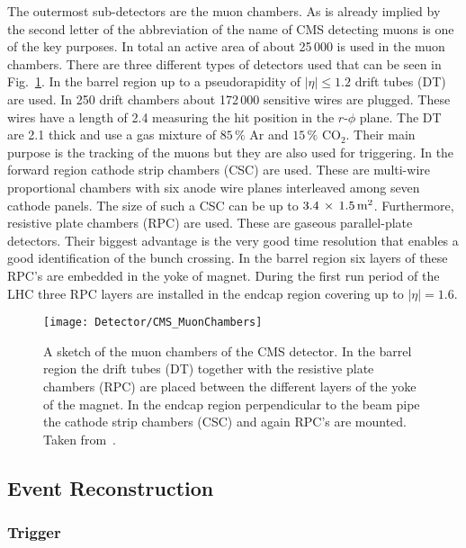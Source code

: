 The outermost sub-detectors are the muon chambers. As is already implied by the second letter of the abbreviation of the name of CMS detecting muons is one of the key purposes. In total an active area of about 25\,000\ms{} is used in the muon chambers. There are three different types of detectors used that can be seen in Fig.~\ref{plot:LHCCMSMuonChambersCMS}. In the barrel region up to a pseudorapidity of $\left|\eta{}\right| \leq{} 1.2$ drift tubes (DT) are used. In 250 drift chambers about 172\,000 sensitive wires are plugged. These wires have a length of 2.4\m{} measuring the hit position in the $r$-$\phi{}$ plane. The DT are 2.1\cm{} thick and use a gas mixture of $85\,\%$ Ar and $15\,\%$ $\text{CO}_{\text{2}}$. Their main purpose is the tracking of the muons but they are also used for triggering. In the forward region cathode strip chambers (CSC) are used. These are multi-wire proportional chambers with six anode wire planes interleaved among seven cathode panels. The size of such a CSC can be up to $3.4\,\times{}\,1.5\,\text{m}^{\text{2}}{}$. Furthermore, resistive plate chambers (RPC) are used. These are gaseous parallel-plate detectors. Their biggest advantage is the very good time resolution that enables a good identification of the bunch crossing. In the barrel region six layers of these RPC's are embedded in the yoke of magnet. During the first run period of the LHC three RPC layers are installed in the endcap region covering up to $\left|\eta{}\right| = 1.6$.

\begin{figure}[Htb]
  \centering
  \texttt{[image: Detector/CMS\_MuonChambers]}
  \caption[Sketch of the muon chambers of CMS]{A sketch of the muon chambers of the CMS detector. In the barrel region the drift tubes (DT) together with the resistive plate chambers (RPC) are placed between the different layers of the yoke of the magnet. In the endcap region perpendicular to the beam pipe the cathode strip chambers (CSC) and again RPC's are mounted. Taken from~. \label{plot:LHCCMSMuonChambersCMS}}
\end{figure}


\subsection{Event Reconstruction \label{LHCCMSEventReco}}

\subsubsection{Trigger}

